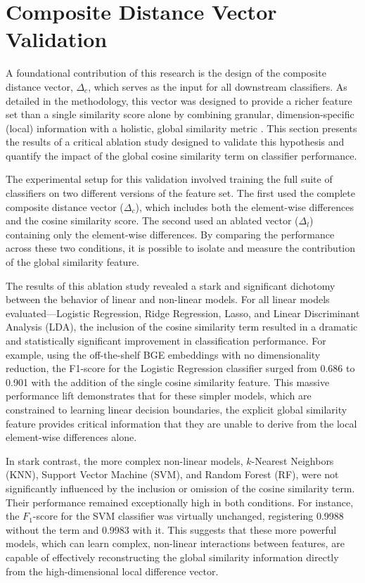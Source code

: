 \section{Composite Distance Vector Validation}
A foundational contribution of this research is the design of the composite distance vector, \(\Delta_c\), which serves as the input for all downstream classifiers. As detailed in the methodology, this vector was designed to provide a richer feature set than a single similarity score alone by combining granular, dimension-specific (local) information with a holistic, global similarity metric . This section presents the results of a critical ablation study designed to validate this hypothesis and quantify the impact of the global cosine similarity term on classifier performance.

The experimental setup for this validation involved training the full suite of classifiers on two different versions of the feature set. The first used the complete composite distance vector (\(\Delta_c\)), which includes both the element-wise differences and the cosine similarity score. The second used an ablated vector (\(\Delta_l\)) containing only the element-wise differences. By comparing the performance across these two conditions, it is possible to isolate and measure the contribution of the global similarity feature.

The results of this ablation study revealed a stark and significant dichotomy between the behavior of linear and non-linear models. For all linear models evaluated—Logistic Regression, Ridge Regression, Lasso, and Linear Discriminant Analysis (LDA), the inclusion of the cosine similarity term resulted in a dramatic and statistically significant improvement in classification performance. For example, using the off-the-shelf BGE embeddings with no dimensionality reduction, the F1-score for the Logistic Regression classifier surged from 0.686 to 0.901 with the addition of the single cosine similarity feature. This massive performance lift demonstrates that for these simpler models, which are constrained to learning linear decision boundaries, the explicit global similarity feature provides critical information that they are unable to derive from the local element-wise differences alone.

In stark contrast, the more complex non-linear models, \(k\)-Nearest Neighbors (KNN), Support Vector Machine (SVM), and Random Forest (RF), were not significantly influenced by the inclusion or omission of the cosine similarity term. Their performance remained exceptionally high in both conditions. For instance, the \(F_1\)-score for the SVM classifier was virtually unchanged, registering 0.9988 without the term and 0.9983 with it. This suggests that these more powerful models, which can learn complex, non-linear interactions between features, are capable of effectively reconstructing the global similarity information directly from the high-dimensional local difference vector.


